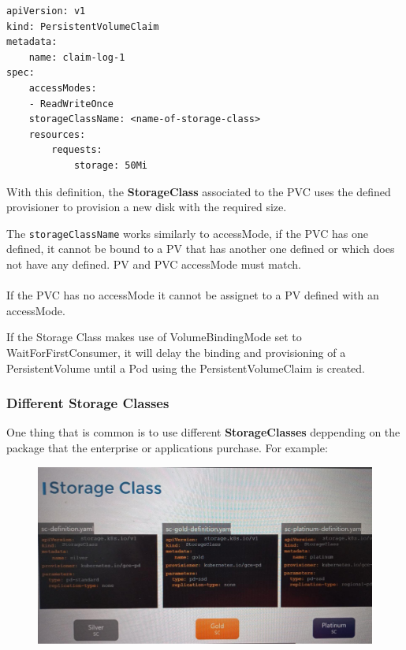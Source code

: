 \documentclass{article}
\newenvironment{blocktemplateIII}[1]{%
    \tcolorbox[beamer,%
    noparskip,breakable,
    ,colframe=Red,%
    colbacklower=LimeGreen!75!LightGreen,%
    title=#1]}%
    {\endtcolorbox}
\newenvironment{codetemplate}[1][]{%
  \mybasecolorbox[#1]
  \itshape
}{%
  \endmybasecolorbox
}
\begin{document}
\begin{codetemplate}{}
\begin{verbatim}
apiVersion: v1
kind: PersistentVolumeClaim
metadata:
    name: claim-log-1
spec:
    accessModes:
    - ReadWriteOnce
    storageClassName: <name-of-storage-class>
    resources:
        requests:
            storage: 50Mi
\end{verbatim}
\end{codetemplate}

With this definition, the \textbf{StorageClass} associated to the PVC uses the defined provisioner to provision a new disk with the required size.

\begin{blocktemplateIII}{WARNING}
The \verb|storageClassName| works similarly to accessMode, if the PVC has one defined, it cannot be bound to a PV that has another one defined or which does not have any defined. PV and PVC accessMode must match. 
\\\\
If the PVC has no accessMode it cannot be assignet to a PV defined with an accessMode.
\end{blocktemplateIII}

\begin{blocktemplateIII}{WARNING}
If the Storage Class makes use of VolumeBindingMode set to WaitForFirstConsumer, it will delay the binding and provisioning of a PersistentVolume until a Pod using the PersistentVolumeClaim is created.
\end{blocktemplateIII}

\subsubsection{Different Storage Classes}
One thing that is common is to use different \textbf{StorageClasses} deppending on the package that the enterprise or applications purchase. For example:

\begin{figure}[H]
    \includegraphics[width=\textwidth]{pictures/stcl.png}
\end{figure}
\end{document}
